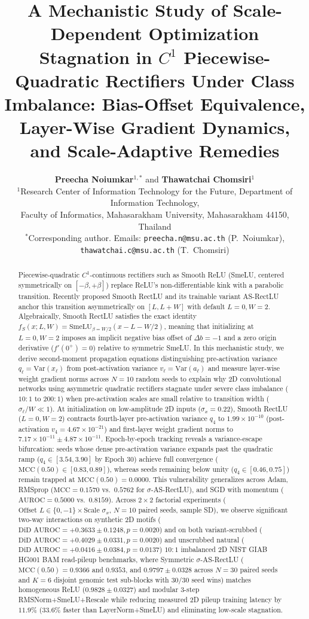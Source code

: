\documentclass[11pt, a4paper]{article}
\title{\vspace{-1.2em}\textbf{A Mechanistic Study of Scale-Dependent Optimization Stagnation in $C^{1}$ Piecewise-Quadratic Rectifiers Under Class Imbalance: Bias-Offset Equivalence, Layer-Wise Gradient Dynamics, and Scale-Adaptive Remedies}\vspace{-0.4em}}
\author{
  \textbf{Preecha Noiumkar}$^{1,\ast}$ and \textbf{Thawatchai Chomsiri}$^{1}$ \\[0.3em]
  \small $^{1}$Research Center of Information Technology for the Future, Department of Information Technology, \\
  \small Faculty of Informatics, Mahasarakham University, Mahasarakham 44150, Thailand \\[0.2em]
  \small $^{\ast}$Corresponding author. Emails: \texttt{preecha.n@msu.ac.th} (P.\ Noiumkar), \texttt{thawatchai.c@msu.ac.th} (T.\ Chomsiri)
}
\date{\vspace{-1.2em}}
\begin{document}
\maketitle

\begin{abstract}
\noindent Piecewise-quadratic $C^{1}$-continuous rectifiers such as Smooth ReLU (SmeLU, centered symmetrically on $[-\beta, +\beta]$) replace ReLU's non-differentiable kink with a parabolic transition. Recently proposed Smooth RectLU and its trainable variant AS-RectLU anchor this transition asymmetrically on $[L, L+W]$ with default $L = 0, W = 2$. Algebraically, Smooth RectLU satisfies the exact identity $f_{S}(x; L, W) = \text{SmeLU}_{\beta=W/2}(x - L - W/2)$, meaning that initializing at $L = 0, W = 2$ imposes an implicit negative bias offset of $\Delta b = -1$ and a zero origin derivative ($f'(0^{+}) = 0$) relative to symmetric SmeLU. In this mechanistic study, we derive second-moment propagation equations distinguishing pre-activation variance $q_{\ell} = \text{Var}(x_{\ell})$ from post-activation variance $v_{\ell} = \text{Var}(a_{\ell})$ and measure layer-wise weight gradient norms across $N = 10$ random seeds to explain why 2D convolutional networks using asymmetric quadratic rectifiers stagnate under severe class imbalance ($10:1$ to $200:1$) when pre-activation scales are small relative to transition width ($\sigma_{\ell}/W \ll 1$). At initialization on low-amplitude 2D inputs ($\sigma_{x} = 0.22$), Smooth RectLU ($L=0, W=2$) contracts fourth-layer pre-activation variance $q_{4}$ to $1.99 \times 10^{-10}$ (post-activation $v_{4} = 4.67 \times 10^{-21}$) and first-layer weight gradient norms to $7.17 \times 10^{-11} \pm 4.87 \times 10^{-11}$. Epoch-by-epoch tracking reveals a variance-escape bifurcation: seeds whose dense pre-activation variance expands past the quadratic ramp ($q_{4} \in [3.54, 3.90]$ by Epoch 30) achieve full convergence ($\text{MCC}(0.50) \in [0.83, 0.89]$), whereas seeds remaining below unity ($q_{4} \in [0.46, 0.75]$) remain trapped at $\text{MCC}(0.50) = 0.0000$. This vulnerability generalizes across Adam, RMSprop ($\text{MCC} = 0.1570$ vs.\ $0.5762$ for $\sigma$-AS-RectLU), and SGD with momentum ($\text{AUROC} = 0.5000$ vs.\ $0.8159$). Across $2 \times 2$ factorial experiments ($\text{Offset } L \in \{0, -1\} \times \text{Scale } \sigma_{x}$, $N = 10$ paired seeds, sample SD), we observe significant two-way interactions on synthetic 2D motifs ($\text{DiD AUROC} = +0.3633 \pm 0.1248, p = 0.0020$) and on both variant-scrubbed ($\text{DiD AUROC} = +0.4029 \pm 0.0331, p = 0.0020$) and unscrubbed natural ($\text{DiD AUROC} = +0.0416 \pm 0.0384, p = 0.0137$) $10:1$ imbalanced 2D NIST GIAB HG001 BAM read-pileup benchmarks, where Symmetric $\sigma$-AS-RectLU ($\text{MCC}(0.50) = 0.9366$ and $0.9353$, and $0.9797 \pm 0.0328$ across $N = 30$ paired seeds and $K = 6$ disjoint genomic test sub-blocks with $30/30$ seed wins) matches homogeneous ReLU ($0.9828 \pm 0.0327$) and modular 3-step RMSNorm+SmeLU+Rescale while reducing measured 2D pileup training latency by $11.9\%$ ($33.6\%$ faster than LayerNorm+SmeLU) and eliminating low-scale stagnation.


\end{abstract}
\end{document}
